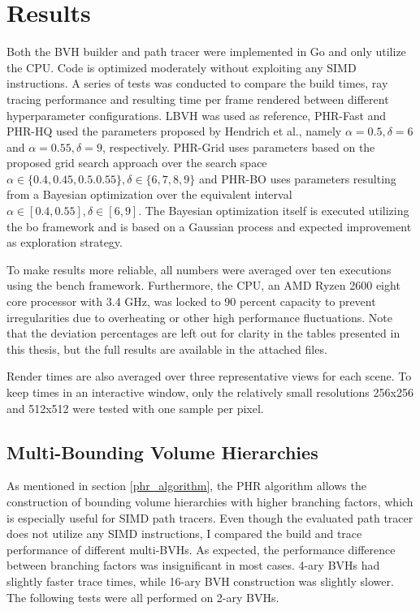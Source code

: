 \section{Results}
\label{results}
Both the BVH builder and path tracer were implemented in Go and only utilize the CPU. Code is optimized moderately without exploiting any SIMD instructions. A series of tests was conducted to compare the build times, ray tracing performance and resulting time per frame rendered between different hyperparameter configurations. LBVH was used as reference, PHR-Fast and PHR-HQ used the parameters proposed by Hendrich et al.\cite{hendrich_parallel_2017}, namely $\alpha=0.5, \delta=6$ and $\alpha=0.55, \delta=9$, respectively. PHR-Grid uses parameters based on the proposed grid search approach over the search space $\alpha\in\{0.4,0.45,0.5.0.55\}, \delta\in\{6,7,8,9\}$ and PHR-BO uses parameters resulting from a Bayesian optimization over the equivalent interval $\alpha\in[0.4,0.55], \delta\in[6,9]$. The Bayesian optimization itself is executed utilizing the bo framework\cite{ou19bo} and is based on a Gaussian process and expected improvement as exploration strategy. 

To make results more reliable, all numbers were averaged over ten executions using the bench framework\cite{ou20bench}. Furthermore, the CPU, an AMD Ryzen 2600 eight core processor with 3.4 GHz, was locked to 90 percent capacity to prevent irregularities due to overheating or other high performance fluctuations. Note that the deviation percentages are left out for clarity in the tables presented in this thesis, but the full results are available in the attached files. 

Render times are also averaged over three representative views for each scene. To keep times in an interactive window, only the relatively small resolutions 256x256 and 512x512 were tested with one sample per pixel. 
\subsection{Multi-Bounding Volume Hierarchies}
\label{multi_bvh}
As mentioned in section \ref{phr_algorithm}, the PHR algorithm allows the construction of bounding volume hierarchies with higher branching factors, which is especially useful for SIMD path tracers. Even though the evaluated path tracer does not utilize any SIMD instructions, I compared the build and trace performance of different multi-BVHs. As expected, the performance difference between branching factors was insignificant in most cases. 4-ary BVHs had slightly faster trace times, while 16-ary BVH construction was slightly slower. The following tests were all performed on 2-ary BVHs. 
